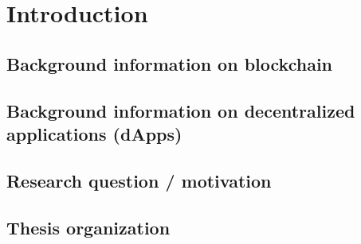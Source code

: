 \chapter{Introduction}\label{chapter:introduction}

\section{Background information on blockchain}\label{sec:}
\section{Background information on decentralized applications (dApps)}\label{sec:}
\section{Research question / motivation}\label{sec:}
\section{Thesis organization}\label{sec:organization}











